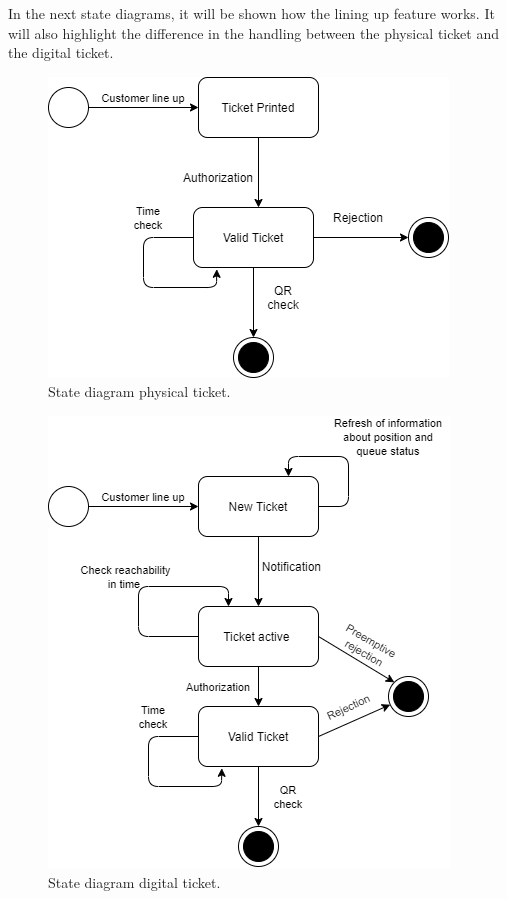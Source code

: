 In the next state diagrams, it will be shown how the lining up feature works. It will also highlight the difference in the handling between the physical ticket and the digital ticket.


\begin{figure}[H]
    \centering
    \includegraphics[scale = 0.5]{images/TicketPhysical.png}
    \caption{State diagram physical ticket.}
\end{figure}


\begin{figure}[H]
    \centering
    \includegraphics[scale = 0.5]{images/statechart.png}
    \caption{State diagram digital ticket.}
\end{figure}


